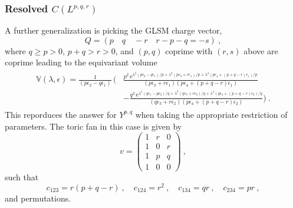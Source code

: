\documentclass[11pt,a4paper]{article}
\theoremstyle{definition}
\theoremstyle{identity}
\theoremstyle{remark}
\newcommand{\be}{\begin{equation}}
\newcommand{\ee}{\end{equation}}
\newcommand{\bea}{\begin{eqnarray}}
\newcommand{\eea}{\end{eqnarray}}
\newcommand{\mathe}{\mathrm{e}}
\newcommand{\e}{\epsilon}
\newcommand{\lam}{\lambda}
\newcommand{\BV}{\mathbb{V}}
\begin{document}
\subsubsection*{Resolved $C(L^{p,q,r})$}
A further generalization is picking the GLSM charge vector, \cite{Cvetic:2005ft,Butti:2005sw}
\be
    Q = (p \quad q\quad -r \quad r-p-q = -s)\ ,
\ee
where $q \geq p > 0$, $p+q > r > 0$, and $(p, q)$ coprime with $(r, s)$ above are coprime
leading to the equivariant volume
\bea
\begin{split}
 \BV (\lam, \e) = \frac{1}{(p \e_2-q \e_1)}\, \Big(&
 \frac{p^2\, \mathe^{\lam^2 (p \e_2-q \e_1)/p+\lam^3 (p \e_3+r \e_1)/p +\lam^4 (p\e_4+ (p+q-r)\e_1)/p}}
 {(p \e_3 + r \e_1) (p\e_4+(p+q-r) \e_1)} \\
 &- \frac{q^2\, \mathe^{\lam^1 (q\e_1-p\e_2)/q+\lam^3 (q \e_3+r \e_2)/q +\lam^4 (q\e_4+(p+q-r)\e_2)/q}}
 {(q\e_3+r \e_2) (p\e_4+(p+q-r)\e_2)} \Big)\ .
 \end{split}
\eea
This reporduces the answer for $Y^{p,q}$ when taking the appropriate restriction of parameters. The toric fan in this case is given by
\be
 v =
 \begin{pmatrix}
 1 & r & 0 \\
 1 & 0 & r \\
 1 & p & q \\
 1 & 0 & 0
 \end{pmatrix}\ ,
\ee
such that
\be
    c_{123} = r (p+q-r)\ , \quad  c_{124} = r^2\ , \quad c_{134} = q r\ , \quad c_{234} = p r\ ,
\ee
and permutations.



\end{document}
